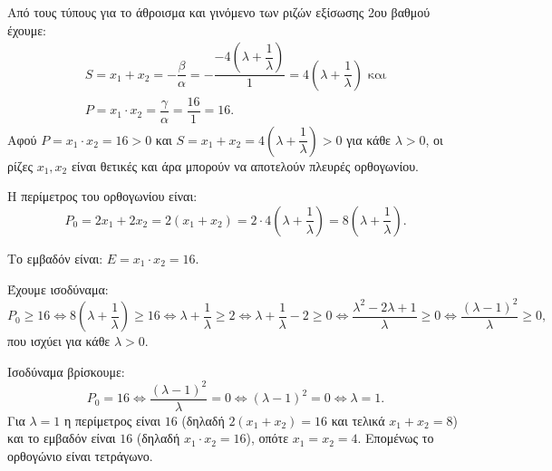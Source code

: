 
\begin{alist}
\item Από τους τύπους για το άθροισμα και γινόμενο των ριζών εξίσωσης 2ου βαθμού έχουμε:
\begin{gather*}
S = x_1 + x_2 = -\dfrac{\beta}{\alpha} = -\dfrac{-4\left(\lambda + \dfrac{1}{\lambda}\right)}{1} = 4\left(\lambda + \dfrac{1}{\lambda}\right)\text{ και} \\
P = x_1 \cdot x_2 = \dfrac{\gamma}{\alpha} = \dfrac{16}{1} = 16.
\end{gather*}
Αφού $P = x_1 \cdot x_2 = 16 > 0$ και $S = x_1 + x_2 = 4\left(\lambda + \dfrac{1}{\lambda}\right) > 0$ για κάθε $\lambda > 0$, οι ρίζες $x_1, x_2$ είναι 
θετικές και άρα μπορούν να αποτελούν πλευρές ορθογωνίου.

\begin{rlist}
\item Η περίμετρος του ορθογωνίου είναι: 
\[P_0 = 2x_1 + 2x_2 = 2(x_1 + x_2) = 2 \cdot 4\left(\lambda + \dfrac{1}{\lambda}\right) = 8\left(\lambda + \dfrac{1}{\lambda}\right).\]
\item Το εμβαδόν είναι: $E = x_1 \cdot x_2 = 16$.
\end{rlist}

\item Έχουμε ισοδύναμα:
\[P_0 \ge 16 \Leftrightarrow 8\left(\lambda + \dfrac{1}{\lambda}\right) \ge 16 \Leftrightarrow \lambda + \dfrac{1}{\lambda} \ge 2 \Leftrightarrow \lambda + \dfrac{1}{\lambda} - 2 \ge 0 \Leftrightarrow \dfrac{\lambda^2 - 2\lambda + 1}{\lambda} \ge 0 \Leftrightarrow \dfrac{(\lambda - 1)^2}{\lambda} \ge 0,\]
που ισχύει για κάθε $\lambda > 0$.

\item Ισοδύναμα βρίσκουμε:
\[P_0 = 16 \Leftrightarrow \dfrac{(\lambda - 1)^2}{\lambda} = 0 \Leftrightarrow (\lambda - 1)^2 = 0 \Leftrightarrow \lambda = 1.\]
Για $\lambda = 1$ η περίμετρος είναι $16$ (δηλαδή $2(x_1 + x_2) = 16$ και τελικά $x_1 + x_2 = 8$) και το
εμβαδόν είναι $16$ (δηλαδή $x_1 \cdot x_2 = 16$), οπότε $x_1 = x_2 = 4$. Επομένως το ορθογώνιο είναι τετράγωνο.
\end{alist}


